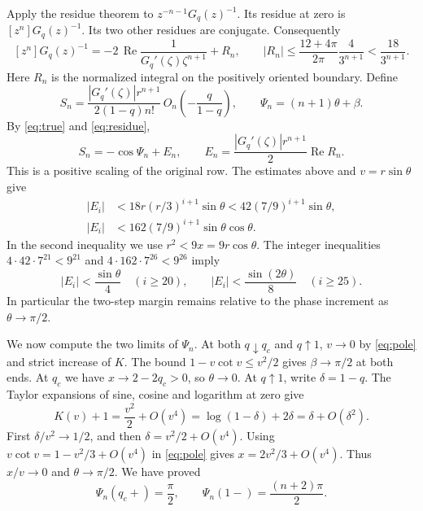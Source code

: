 \documentclass[11pt]{article}
\begin{document}
Apply the residue theorem to \(z^{-n-1}G_q(z)^{-1}\). Its residue at zero is \([z^n]G_q(z)^{-1}\). Its two other residues are conjugate. Consequently
\begin{equation}\label{eq:residue}
 [z^n]G_q(z)^{-1}
  =-2\,\operatorname{Re}\frac{1}{G_q'(\zeta)\zeta^{n+1}}+R_n,\qquad
 |R_n|\le \frac{12+4\pi}{2\pi}\frac{4}{3^{n+1}}<\frac{18}{3^{n+1}}.
\end{equation}
Here \(R_n\) is the normalized integral on the positively oriented boundary. Define
\[
 S_n=\frac{|G_q'(\zeta)|r^{n+1}}{2(1-q)n!}\,O_n\!\left(-\frac{q}{1-q}\right),
 \qquad \Psi_n=(n+1)\theta+\beta .
\]
By \eqref{eq:true} and \eqref{eq:residue},
\begin{equation}\label{eq:model}
 S_n=-\cos\Psi_n+E_n,\qquad
 E_n=\frac{|G_q'(\zeta)|r^{n+1}}2\operatorname{Re}R_n .
\end{equation}
This is a positive scaling of the original row. The estimates above and \(v=r\sin\theta\) give
\begin{align*}
 |E_i|&<18r(r/3)^{i+1}\sin\theta
        <42(7/9)^{i+1}\sin\theta,\\
 |E_i|&<162(7/9)^{i+1}\sin\theta\cos\theta .
\end{align*}
In the second inequality we use \(r^2<9x=9r\cos\theta\).
The integer inequalities \(4\cdot42\cdot7^{21}<9^{21}\) and
\(4\cdot162\cdot7^{26}<9^{26}\) imply
\begin{equation}\label{eq:error}
 |E_i|<\frac{\sin\theta}{4}\quad(i\ge20),\qquad
 |E_i|<\frac{\sin(2\theta)}8\quad(i\ge25).
\end{equation}
In particular the two-step margin remains relative to the phase increment as \(\theta\to\pi/2\).

We now compute the two limits of \(\Psi_n\). At both \(q\downarrow q_c\) and \(q\uparrow1\), \(v\to0\) by \eqref{eq:pole} and strict increase of \(K\). The bound \(1-v\cot v\le v^2/2\) gives \(\beta\to\pi/2\) at both ends. At \(q_c\) we have \(x\to2-2q_c>0\), so \(\theta\to0\). At \(q\uparrow1\), write \(\delta=1-q\). The Taylor expansions of sine, cosine and logarithm at zero give
\[
 K(v)+1=\frac{v^2}{2}+O(v^4)
        =\log(1-\delta)+2\delta=\delta+O(\delta^2).
\]
First \(\delta/v^2\to1/2\), and then \(\delta=v^2/2+O(v^4)\).
Using \(v\cot v=1-v^2/3+O(v^4)\) in \eqref{eq:pole} gives
\(x=2v^2/3+O(v^4)\). Thus \(x/v\to0\) and \(\theta\to\pi/2\).
We have proved
\begin{equation}\label{eq:ends}
 \Psi_n(q_c+)=\frac{\pi}{2},\qquad
 \Psi_n(1-)=\frac{(n+2)\pi}{2}.
\end{equation}
\end{document}

